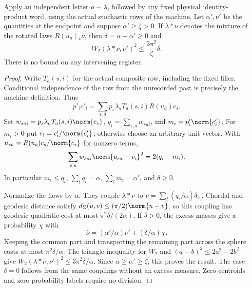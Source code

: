 \begin{lemma}\label{lem:centroidtransport61}
Apply an independent letter $a\sim\lambda$, followed by any fixed
physical identity-product word, using the actual stochastic rows of
the machine. Let $\alpha',\nu'$ be the quantities at the endpoint and
suppose $\alpha'\ge\zeta>0$. If $\lambda*\nu$ denotes the mixture of
the rotated laws $R(u_a)_*\nu$, then $\delta=\alpha-\alpha'\ge0$ and
\begin{equation}\label{eq:centroidtransport61}
 W_2(\lambda*\nu,\nu')^2\le\frac{3\pi^2}{\zeta}\delta.
\end{equation}
There is no bound on any intervening register.
\end{lemma}
\begin{proof}
Write $T_a(s,i)$ for the actual composite row, including the fixed
filler. Conditional independence of the row from the unrecorded past
is precisely the machine definition. Thus
\[
 p'_i c'_i=\sum_{s,a}p_s\lambda_aT_a(s,i)R(u_a)c_s.
\]
Set $w_{sai}=p_s\lambda_aT_a(s,i)\norm{c_s}$,
$q_i=\sum_{s,a}w_{sai}$, and $m_i=p'_i\norm{c'_i}$.
For $m_i>0$ put $v_i=c'_i/\norm{c'_i}$; otherwise choose an arbitrary
unit vector. With $u_{sa}=R(u_a)c_s/\norm{c_s}$ for nonzero terms,
\begin{equation}\label{eq:flowidentity61}
 \sum_{s,a}w_{sai}\norm{u_{sa}-v_i}^2=2(q_i-m_i).
\end{equation}
In particular $m_i\le q_i$, $\sum_iq_i=\alpha$,
$\sum_im_i=\alpha'$, and $\delta\ge0$.

Normalize the flows by $\alpha$. They couple $\lambda*\nu$ to
$\widehat\nu=\sum_i(q_i/\alpha)\delta_{v_i}$. Chordal and geodesic
distance satisfy $d_\Sigma(u,v)\le(\pi/2)\norm{u-v}$, so this
coupling has geodesic quadratic cost at most $\pi^2\delta/(2\alpha)$.
If $\delta>0$, the excess masses give a probability $\chi$ with
\[
 \widehat\nu=(\alpha'/\alpha)\nu'+(\delta/\alpha)\chi.
\]
Keeping the common part and transporting the remaining part across the
sphere costs at most $\pi^2\delta/\alpha$. The triangle inequality
for $W_2$ and $(a+b)^2\le2a^2+2b^2$ give
$W_2(\lambda*\nu,\nu')^2\le3\pi^2\delta/\alpha$.
Since $\alpha\ge\alpha'\ge\zeta$, this proves the result.
The case $\delta=0$ follows from the same couplings without an excess
measure. Zero centroids and zero-probability labels require no division.
\end{proof}

